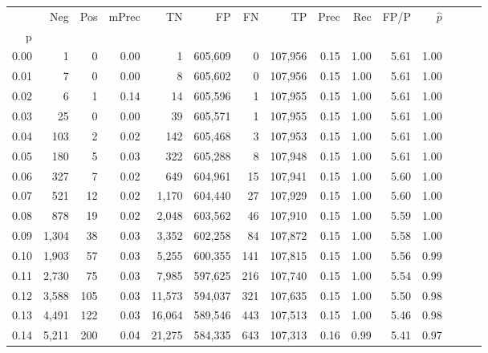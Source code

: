 \begin{tabular}{rrrrrrrrrrrrrrr}
\toprule
{} &     Neg &    Pos & mPrec &       TN &       FP &       FN &       TP &  Prec &   Rec &  FP/P & $\hat{p}$ \\
p    &         &        &       &          &          &          &          &       &       &       &           \\
\midrule
0.00 &       1 &      0 &  0.00 &        1 &  605,609 &        0 &  107,956 &  0.15 &  1.00 &  5.61 &      1.00 \\
0.01 &       7 &      0 &  0.00 &        8 &  605,602 &        0 &  107,956 &  0.15 &  1.00 &  5.61 &      1.00 \\
0.02 &       6 &      1 &  0.14 &       14 &  605,596 &        1 &  107,955 &  0.15 &  1.00 &  5.61 &      1.00 \\
0.03 &      25 &      0 &  0.00 &       39 &  605,571 &        1 &  107,955 &  0.15 &  1.00 &  5.61 &      1.00 \\
0.04 &     103 &      2 &  0.02 &      142 &  605,468 &        3 &  107,953 &  0.15 &  1.00 &  5.61 &      1.00 \\
0.05 &     180 &      5 &  0.03 &      322 &  605,288 &        8 &  107,948 &  0.15 &  1.00 &  5.61 &      1.00 \\
0.06 &     327 &      7 &  0.02 &      649 &  604,961 &       15 &  107,941 &  0.15 &  1.00 &  5.60 &      1.00 \\
0.07 &     521 &     12 &  0.02 &    1,170 &  604,440 &       27 &  107,929 &  0.15 &  1.00 &  5.60 &      1.00 \\
0.08 &     878 &     19 &  0.02 &    2,048 &  603,562 &       46 &  107,910 &  0.15 &  1.00 &  5.59 &      1.00 \\
0.09 &   1,304 &     38 &  0.03 &    3,352 &  602,258 &       84 &  107,872 &  0.15 &  1.00 &  5.58 &      1.00 \\
0.10 &   1,903 &     57 &  0.03 &    5,255 &  600,355 &      141 &  107,815 &  0.15 &  1.00 &  5.56 &      0.99 \\
0.11 &   2,730 &     75 &  0.03 &    7,985 &  597,625 &      216 &  107,740 &  0.15 &  1.00 &  5.54 &      0.99 \\
0.12 &   3,588 &    105 &  0.03 &   11,573 &  594,037 &      321 &  107,635 &  0.15 &  1.00 &  5.50 &      0.98 \\
0.13 &   4,491 &    122 &  0.03 &   16,064 &  589,546 &      443 &  107,513 &  0.15 &  1.00 &  5.46 &      0.98 \\
0.14 &   5,211 &    200 &  0.04 &   21,275 &  584,335 &      643 &  107,313 &  0.16 &  0.99 &  5.41 &      0.97 \\

\end{tabular}
